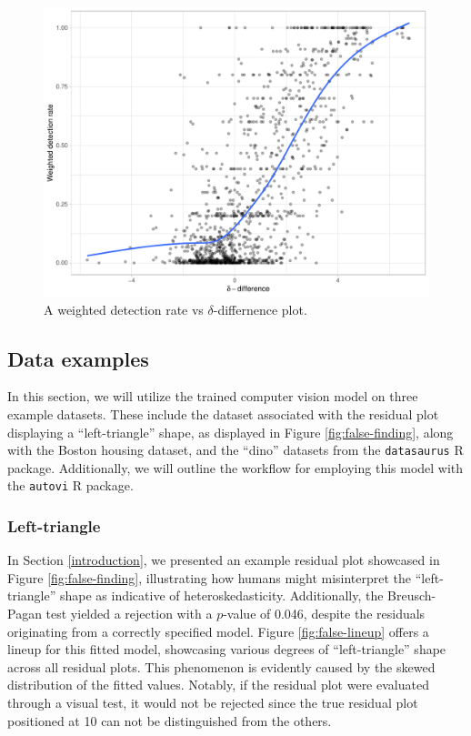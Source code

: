 \documentclass[]{interact}
\theoremstyle{plain}%
\theoremstyle{definition}
\theoremstyle{remark}
\begin{document}
\begin{figure}[!h]

{\centering \includegraphics[width=1\linewidth]{paper_files/figure-latex/delta-1} 

}

\caption{A weighted detection rate vs $\delta$-differnence plot.}\label{fig:delta}
\end{figure}

\subsection{Data examples}\label{data-examples}

In this section, we will utilize the trained computer vision model on
three example datasets. These include the dataset associated with the
residual plot displaying a ``left-triangle'' shape, as displayed in
Figure \ref{fig:false-finding}, along with the Boston housing dataset,
and the ``dino'' datasets from the \texttt{datasaurus} R package.
Additionally, we will outline the workflow for employing this model with
the \texttt{autovi} R package.

\subsubsection{Left-triangle}\label{left-triangle}

In Section \ref{introduction}, we presented an example residual plot
showcased in Figure \ref{fig:false-finding}, illustrating how humans
might misinterpret the ``left-triangle'' shape as indicative of
heteroskedasticity. Additionally, the Breusch-Pagan test yielded a
rejection with a \(p\)-value of 0.046, despite the residuals originating
from a correctly specified model. Figure \ref{fig:false-lineup} offers a
lineup for this fitted model, showcasing various degrees of
``left-triangle'' shape across all residual plots. This phenomenon is
evidently caused by the skewed distribution of the fitted values.
Notably, if the residual plot were evaluated through a visual test, it
would not be rejected since the true residual plot positioned at 10 can
not be distinguished from the others.
\end{document}
